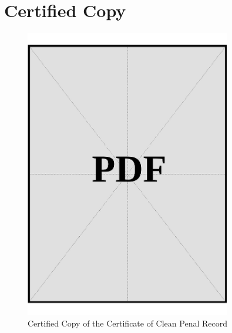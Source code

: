 \clearpage

\section*{Certified Copy}
\vspace*{\fill}
\begin{figure}[h]
    \centering
    \includegraphics[page=1, width=0.8\textwidth]{../docs/applicant/police-clearance-certificate/certified-copies.pdf}
    \caption{Certified Copy of the Certificate of Clean Penal Record}
    \label{fig:police-certified-copy}
\end{figure}
\vspace*{\fill}
\clearpage